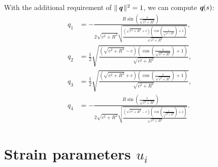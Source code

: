 \documentclass[11pt,letterpaper]{amsart}
\DeclareMathOperator*{\qq}{\textit{\textbf{q}}}
\begin{document}
With the additional requirement of $ \|\qq\|^2=1 $, we can compute $ \qq(s) $:
\begin{align*}\label{eq:q}
	q_1 &= -\frac{R \sin \left(\frac{s}{\sqrt{c^2+R^2}}\right)}{2 \sqrt{c^2+R^2} \sqrt{\frac{\left(\sqrt{c^2+R^2}+c\right) \left(\cos \left(\frac{s}{\sqrt{c^2+R^2}}\right)+1\right)}{\sqrt{c^2+R^2}}}}, \\
	q_2 &= \frac{1}{2} \sqrt{\frac{\left(\sqrt{c^2+R^2}-c\right) \left(\cos \left(\frac{s}{\sqrt{c^2+R^2}}\right)+1\right)}{\sqrt{c^2+R^2}}}, \\
	q_3 &= \frac{1}{2} \sqrt{\frac{\left(\sqrt{c^2+R^2}+c\right) \left(\cos \left(\frac{s}{\sqrt{c^2+R^2}}\right)+1\right)}{\sqrt{c^2+R^2}}}, \\
	q_4 &=-\frac{R \sin \left(\frac{s}{\sqrt{c^2+R^2}}\right)}{2 \sqrt{c^2+R^2} \sqrt{\frac{\left(\sqrt{c^2+R^2}-c\right) \left(\cos \left(\frac{s}{\sqrt{c^2+R^2}}\right)+1\right)}{\sqrt{c^2+R^2}}}}.
\end{align*}


\section{Strain parameters $ u_i $}
%
\end{document}
